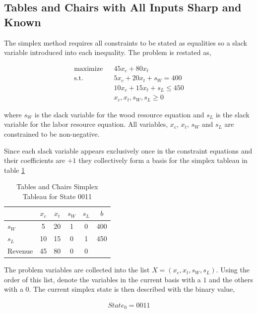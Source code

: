 \subsection{Tables and Chairs with All Inputs Sharp and Known}

The simplex method requires all constraints to be stated as equalities so a slack variable introduced into each inequality. The problem is restated as,

\begin{align*}
\text{maximize} && 45 x_c + 80 x_t\\
\text{s.t.}     && 5 x_c + 20 x_t + s_W = 400\\
                && 10 x_c + 15 x_t + s_L\le 450\\
                && x_c, x_t, s_W, s_L \ge 0
\end{align*}

where $s_W$ is the slack variable for the wood resource equation and $s_L$ is the slack variable for the labor resource equation. All variables, $x_c$, $x_t$, $s_W$ and $s_L$ are constrained to be non-negative.

Since each slack variable appears exclusively once in the constraint equations and their coefficients are $+1$ they collectively form a basis for the simplex tableau in table \ref{tab:tc0011}

\begin{table}
\centering
\begin{tabular}{| l | c c c c | c |}
\hline
        & $x_c$ & $x_t$ & $s_W$ & $s_L$ & $b$\\
\hline
$s_W$   & 5     & 20    & 1     & 0     & 400\\
$s_L$   & 10    & 15    & 0     & 1     & 450\\
\hline
Revenue & 45    & 80    & 0     & 0     &\\
\hline
\end{tabular}
  \caption[Tables and Chairs Simplex Tableau for State 0011]
          {Tables and Chairs Simplex Tableau for State 0011}
  \label{tab:tc0011}
\end{table}


The problem variables are collected into the list $X = (x_c, x_t, s_W, s_L)$. Using the order of this list, denote the variables in the current basis with a $1$ and the others with a $0$. The current simplex state is then described with the binary value,

\begin{align*}
State_0 = 0011
\end{align*}

